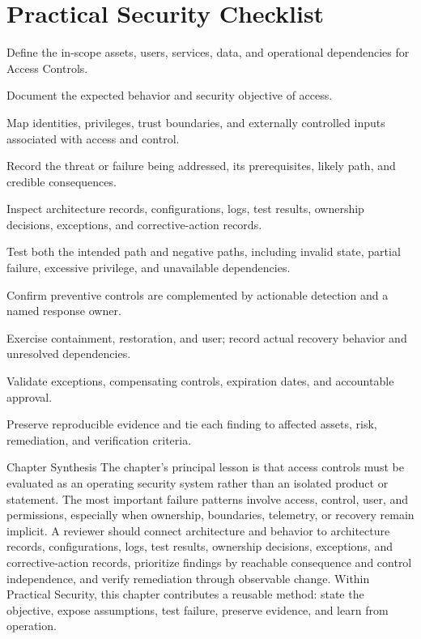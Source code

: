 \documentclass[11pt,letterpaper]{article}
\begin{document}
\section*{Practical Security Checklist}
\begin{CornellChecklist}
\item Define the in-scope assets, users, services, data, and operational dependencies for Access Controls.
\item Document the expected behavior and security objective of access.
\item Map identities, privileges, trust boundaries, and externally controlled inputs associated with access and control.
\item Record the threat or failure being addressed, its prerequisites, likely path, and credible consequences.
\item Inspect architecture records, configurations, logs, test results, ownership decisions, exceptions, and corrective-action records.
\item Test both the intended path and negative paths, including invalid state, partial failure, excessive privilege, and unavailable dependencies.
\item Confirm preventive controls are complemented by actionable detection and a named response owner.
\item Exercise containment, restoration, and user; record actual recovery behavior and unresolved dependencies.
\item Validate exceptions, compensating controls, expiration dates, and accountable approval.
\item Preserve reproducible evidence and tie each finding to affected assets, risk, remediation, and verification criteria.
\end{CornellChecklist}
\begin{CornellSummaryBox}{Chapter Synthesis}
The chapter's principal lesson is that access controls must be evaluated as an operating security system rather than an isolated product or statement. The most important failure patterns involve access, control, user, and permissions, especially when ownership, boundaries, telemetry, or recovery remain implicit. A reviewer should connect architecture and behavior to architecture records, configurations, logs, test results, ownership decisions, exceptions, and corrective-action records, prioritize findings by reachable consequence and control independence, and verify remediation through observable change. Within Practical Security, this chapter contributes a reusable method: state the objective, expose assumptions, test failure, preserve evidence, and learn from operation.
\end{CornellSummaryBox}
\end{document}
